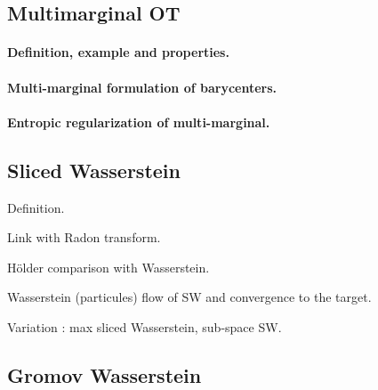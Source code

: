 \subsection{Multimarginal OT}
\label{subsec:multi-marginal}

\paragraph{Definition, example and properties.}


\paragraph{Multi-marginal formulation of barycenters.}


\paragraph{Entropic regularization of multi-marginal.} 



\subsection{Sliced Wasserstein}

Definition. 

Link with Radon transform.

H\"older comparison with Wasserstein.

Wasserstein (particules) flow of SW and convergence to the target.

Variation : max sliced Wasserstein, sub-space SW. 


\subsection{Gromov Wasserstein}

